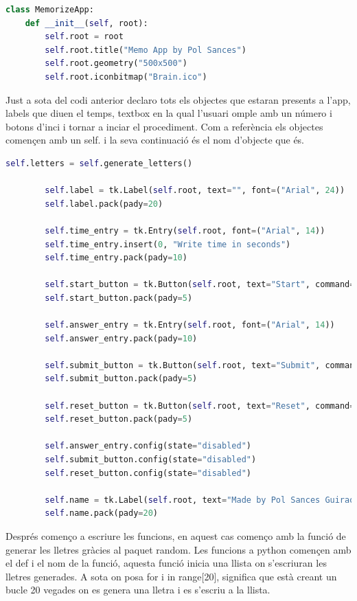 \begin{lstlisting}[language=Python, style=colorEX, caption=Inici de la classe i especificació de la finestra]
class MemorizeApp:    
    def __init__(self, root):
        self.root = root
        self.root.title("Memo App by Pol Sances")
        self.root.geometry("500x500")
        self.root.iconbitmap("Brain.ico")
\end{lstlisting}

Just a sota del codi anterior declaro tots els objectes que estaran presents a l'app, labels que diuen el temps, textbox en la qual l'usuari omple amb un número i botons d'inci i tornar a inciar el procediment. Com a referència els objectes començen amb un self. i la seva continuació és el nom d'objecte que és. 
\begin{lstlisting}[language=Python, style=colorEX, caption=Declaració d'objectes necessaris pel funcionament de l'App]
        self.letters = self.generate_letters()

        self.label = tk.Label(self.root, text="", font=("Arial", 24))
        self.label.pack(pady=20)

        self.time_entry = tk.Entry(self.root, font=("Arial", 14))
        self.time_entry.insert(0, "Write time in seconds")
        self.time_entry.pack(pady=10)

        self.start_button = tk.Button(self.root, text="Start", command=self.start_memorize)
        self.start_button.pack(pady=5)

        self.answer_entry = tk.Entry(self.root, font=("Arial", 14))
        self.answer_entry.pack(pady=10)

        self.submit_button = tk.Button(self.root, text="Submit", command=self.check_answers)
        self.submit_button.pack(pady=5)

        self.reset_button = tk.Button(self.root, text="Reset", command=self.reset)
        self.reset_button.pack(pady=5)

        self.answer_entry.config(state="disabled")
        self.submit_button.config(state="disabled")
        self.reset_button.config(state="disabled")

        self.name = tk.Label(self.root, text="Made by Pol Sances Guirao", font=("Arial", 8))
        self.name.pack(pady=20)
\end{lstlisting}

Després començo a escriure les funcions, en aquest cas començo amb la funció de generar les lletres gràcies al paquet random. Les funcions a python començen amb el def i el nom de la funció, aquesta funció inicia una llista on s'escriuran les lletres generades. A sota on posa for i in range[20], significa que està creant un bucle 20 vegades on es genera una lletra i es s'escriu a la llista.

